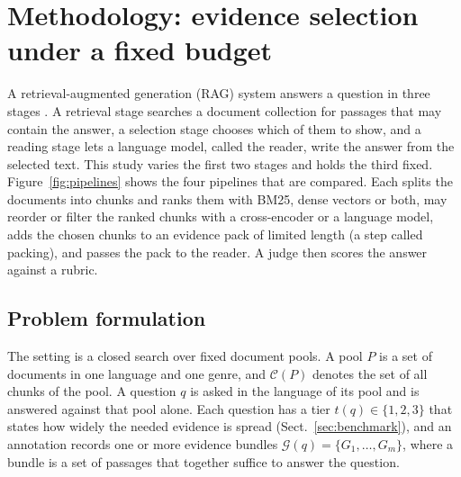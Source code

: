 \section{Methodology: evidence selection under a fixed budget}
\label{sec:methods}

A retrieval-augmented generation (RAG) system answers a question in three stages \citep{lewis2020rag,gao2023ragsurvey}. A retrieval stage searches a document collection for passages that may contain the answer, a selection stage chooses which of them to show, and a reading stage lets a language model, called the reader, write the answer from the selected text. This study varies the first two stages and holds the third fixed. Figure~\ref{fig:pipelines} shows the four pipelines that are compared. Each splits the documents into chunks and ranks them with BM25, dense vectors or both, may reorder or filter the ranked chunks with a cross-encoder or a language model, adds the chosen chunks to an evidence pack of limited length (a step called packing), and passes the pack to the reader. A judge then scores the answer against a rubric.


\subsection{Problem formulation}
\label{sec:formulation}
The setting is a closed search over fixed document pools. A pool $P$ is a set of documents in one language and one genre, and $\mathcal{C}(P)$ denotes the set of all chunks of the pool. A question $q$ is asked in the language of its pool and is answered against that pool alone. Each question has a tier $t(q)\in\{1,2,3\}$ that states how widely the needed evidence is spread (Sect.~\ref{sec:benchmark}), and an annotation records one or more evidence bundles $\mathcal{G}(q)=\{G_1,\dots,G_m\}$, where a bundle is a set of passages that together suffice to answer the question.

